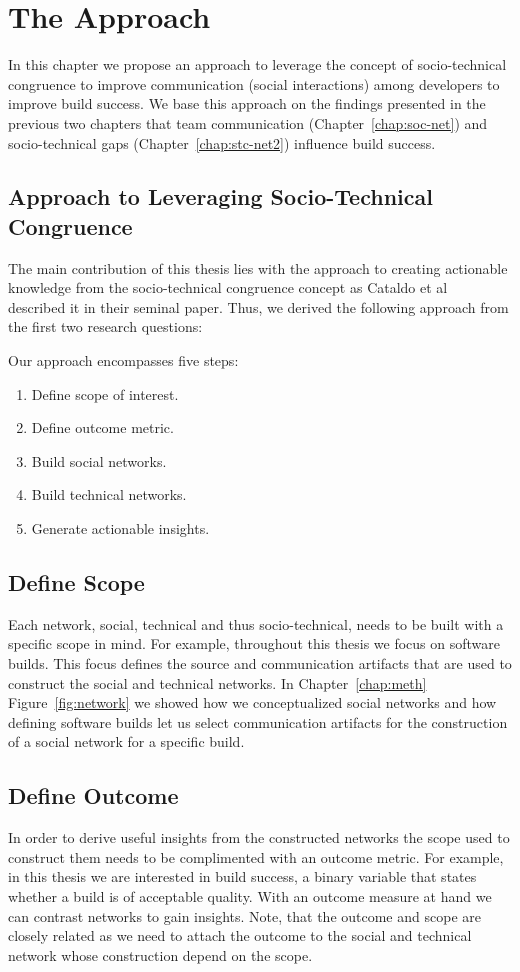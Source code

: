 \section{The Approach}
\label{chap:approach}
In this chapter we propose an approach to leverage the concept of socio-technical congruence to improve communication (social interactions) among developers to improve build success.
We base this approach on the findings presented in the previous two chapters that team communication (Chapter~\ref{chap:soc-net}) and socio-technical gaps (Chapter~\ref{chap:stc-net2})  influence build success.

\subsection{Approach to Leveraging Socio-Technical Congruence}
The main contribution of this thesis lies with the approach to creating actionable knowledge from the socio-technical congruence concept as Cataldo et al~\cite{cataldo:cscw:2006} described it in their seminal paper.
Thus, we derived the following approach from the first two research questions:

Our approach encompasses five steps:
\begin{enumerate}
\item Define scope of interest.
\item Define outcome metric.
\item Build social networks.
\item Build technical networks.
\item Generate actionable insights.
\end{enumerate}

\subsection{Define Scope} 
Each network, social, technical and thus socio-technical, needs to be built with a specific scope in mind.
For example, throughout this thesis we focus on software builds.
This focus defines the source and communication artifacts that are used to construct the social and technical networks.
In Chapter~\ref{chap:meth} Figure~\ref{fig:network} we showed how we conceptualized social networks and how defining software builds let us select communication artifacts for the construction of a social network for a specific build.

\subsection{Define Outcome}
In order to derive useful insights from the constructed networks the scope used to construct them needs to be complimented with an outcome metric.
For example, in this thesis we are interested in build success, a binary variable that states whether a build is of acceptable quality.
With an outcome measure at hand we can contrast networks to gain insights.
Note, that the outcome and scope are closely related as we need to attach the outcome to the social and technical network whose construction depend on the scope.


